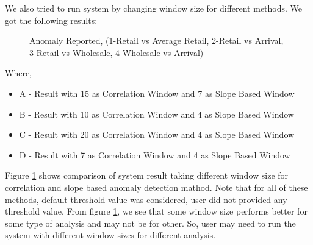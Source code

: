 We also tried to run system by changing window size for different methods. We got the following results:
		
\begin{figure}[H]
\centering
{}
\caption{Anomaly Reported, (1-Retail vs Average Retail, 2-Retail vs Arrival, 3-Retail vs Wholesale, 4-Wholesale vs Arrival)}
\label{fig:comparisonMultipleWindows}
\end{figure}

Where,
\begin{itemize}
 \item A - Result with 15 as Correlation Window and 7 as Slope Based Window
 \item B - Result with 10 as Correlation Window and 4 as Slope Based Window
 \item C - Result with 20 as Correlation Window and 4 as Slope Based Window
 \item D - Result with 7 as Correlation Window and 4 as Slope Based Window
\end{itemize}


Figure \ref{fig:comparisonMultipleWindows} shows comparison of system result taking different window size for correlation and slope based anomaly detection mathod. Note that for all of these methods, default threshold value was considered, user did not provided any threshold value. From figure \ref{fig:comparisonMultipleWindows}, we see that some window size performs better for some type of analysis and may not be for other. So, user may need to run the system with different window sizes for different analysis. 			